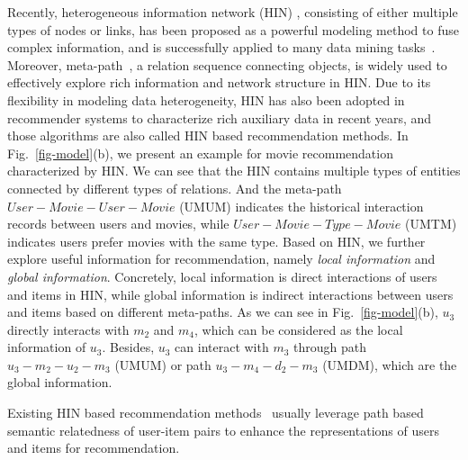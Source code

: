 Recently, heterogeneous information network (HIN) , consisting of either multiple types of nodes or links, has been proposed as a powerful modeling method to fuse complex information, and is successfully applied to many data mining tasks~\cite{shi2017survey}. Moreover, meta-path~\cite{shi2017survey}, a relation sequence connecting objects, is widely used to effectively explore rich information and network structure in HIN.  Due to its flexibility in modeling data heterogeneity, HIN has also been adopted in recommender systems to characterize rich auxiliary data in recent years, and those algorithms are also called HIN based recommendation methods. In Fig.~\ref{fig-model}(b), we present an example for movie recommendation characterized by HIN. We can see that the HIN contains multiple types of entities connected by different types of relations. %
And the meta-path $User-Movie-User-Movie$ (UMUM) indicates the historical interaction records between users and movies, while $User-Movie-Type-Movie$ (UMTM) indicates users prefer movies with the same type. Based on HIN, we further explore useful information for recommendation, namely \emph{local information} and \emph{global information}. Concretely, local information is direct interactions of users and items in HIN, while global information is indirect interactions between users and items based on different meta-paths. As we can see in Fig.~\ref{fig-model}(b), $u_3$ directly interacts with $m_2$ and $m_4$, which can be considered as the local information of $u_3$. Besides, $u_3$ can interact with $m_3$ through path $u_3 - m_2 - u_2 - m_3$ (UMUM) or path $u_3 - m_4 - d_2 - m_3$ (UMDM), which are the global information.     



Existing HIN based recommendation methods~\cite{shi2017heterogeneous,zhao2017meta} usually leverage path based semantic relatedness of user-item pairs to enhance the representations of users and items for recommendation. 

